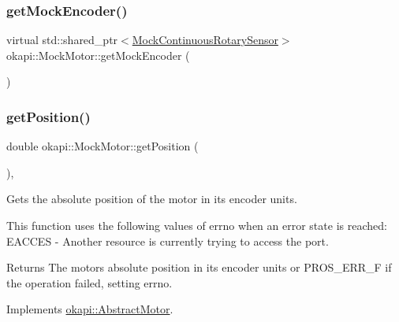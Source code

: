 \mbox{\label{classokapi_1_1MockMotor_a87a24cbfaf90edacf369a23751f4c009}} 
\subsubsection{\texorpdfstring{getMockEncoder()}{getMockEncoder()}}
{\footnotesize\ttfamily virtual std\+::shared\+\_\+ptr$<$\mbox{\hyperlink{classokapi_1_1MockContinuousRotarySensor}{Mock\+Continuous\+Rotary\+Sensor}}$>$ okapi\+::\+Mock\+Motor\+::get\+Mock\+Encoder (\begin{DoxyParamCaption}{ }\end{DoxyParamCaption})\hspace{0.3cm}{\ttfamily [virtual]}}

\mbox{\label{classokapi_1_1MockMotor_abc8adf400fdadd017c8b082494f9c3a9}} 
\subsubsection{\texorpdfstring{getPosition()}{getPosition()}}
{\footnotesize\ttfamily double okapi\+::\+Mock\+Motor\+::get\+Position (\begin{DoxyParamCaption}{ }\end{DoxyParamCaption})\hspace{0.3cm}{\ttfamily [override]}, {\ttfamily [virtual]}}



Gets the absolute position of the motor in its encoder units. 

This function uses the following values of errno when an error state is reached\+: E\+A\+C\+C\+ES -\/ Another resource is currently trying to access the port.

\begin{DoxyReturn}{Returns}
The motor\textquotesingle{}s absolute position in its encoder units or P\+R\+O\+S\+\_\+\+E\+R\+R\+\_\+F if the operation failed, setting errno. 
\end{DoxyReturn}


Implements \mbox{\hyperlink{classokapi_1_1AbstractMotor_a4f9d74e054600c5ddb49ebb8164004d3}{okapi\+::\+Abstract\+Motor}}.


